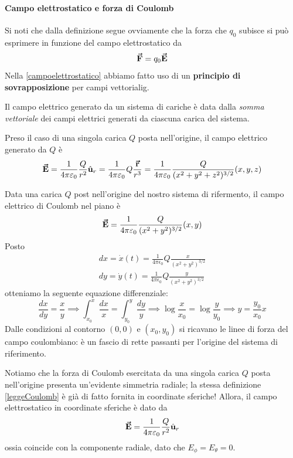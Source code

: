 \paragraph{Campo elettrostatico e forza di Coulomb}
Si noti che dalla definizione segue ovviamente che la forza che $q_0$ subisce si può esprimere in funzione del campo elettrostatico da
\begin{equation}
	\vb*{\va{F}}=q_0\vb*{\va{E}}
\end{equation}
Nella \ref{campoelettrostatico} abbiamo fatto uso di un \textbf{principio di sovrapposizione} per campi vettorialig.
\begin{principle}
	Il campo elettrico generato da un sistema di cariche è data dalla \textit{somma vettoriale} dei campi elettrici generati da ciascuna carica del sistema.
\end{principle}
Preso il caso di una singola carica $Q$ posta nell'origine, il campo elettrico generato da $Q$ è
\begin{equation*}
	\vb*{\va{E}}=\frac{1}{4\pi\varepsilon_0}\frac{Q}{r^2}\hat{\mathbf{u}}_{r}=\frac{1}{4\pi\varepsilon_0}Q\frac{\vb*{\va{r}}}{r^3}=\frac{1}{4\pi\varepsilon_0}\frac{Q}{(x^2+y^2+z^2)^{3/2}}(x,y,z)
\end{equation*}
\begin{examplewt}
	Data una carica $Q$ post nell'origine del nostro sistema di rifermento, il campo elettrico di Coulomb nel piano è
	\begin{equation*}
		\vb*{\va{E}}=\frac{1}{4\pi\varepsilon_0}\frac{Q}{(x^2+y^2)^{3/2}}(x,y)
	\end{equation*}
Posto
\begin{gather*}
	dx=\dot{x}(t)=\frac{1}{4\pi\epsilon_0}Q\frac{x}{(x^2+y^2)^{3/2}}\\
	dy=\dot{y}(t)=\frac{1}{4\pi\epsilon_0}Q\frac{y}{(x^2+y^2)^{3/2}}
\end{gather*}
otteniamo la seguente equazione differenziale:
\begin{equation*}
	\frac{dx}{dy}=\frac{x}{y}\implies\int_{x_0}^{x}\frac{dx}{x}=\int_{y_0}^{y}\frac{dy}{y}
	\implies \log\frac{x}{x_0}=\log\frac{y}{y_0}\implies y=\frac{y_0}{x_0}x
\end{equation*}
Dalle condizioni al contorno $(0,0)$ e $(x_0,y_0)$ si ricavano le linee di forza del campo coulombiano: è un fascio di rette passanti per l'origine del sistema di riferimento.
\end{examplewt}
\begin{observe}
	Notiamo che la forza di Coulomb esercitata da una singola carica $Q$ posta nell'origine presenta un'evidente simmetria radiale; la stessa definizione \ref{leggeCoulomb} è già di fatto fornita in coordinate sferiche! Allora, il campo elettrostatico in coordinate sferiche è dato da
	\begin{equation*}
		\vb*{\va{E}}=\frac{1}{4\pi\varepsilon_0}\frac{Q}{r^2}\hat{\mathbf{u}}_{r}
	\end{equation*}
	ossia coincide con la componente radiale, dato che $E_\phi=E_\theta=0$.
\end{observe}

